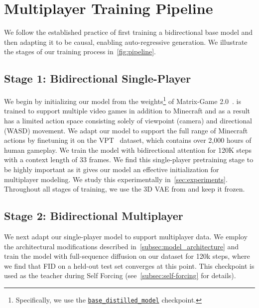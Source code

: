 
\section{Multiplayer Training Pipeline}
\label{sec:model_architecture}
We follow the established practice of first training a bidirectional base model and then adapting it to be causal, enabling auto-regressive generation. We illustrate the stages of our training process in~\cref{fig:pipeline}.


\subsection{Stage 1: Bidirectional Single-Player}
\label{sec:bidirectional_sp_training}

We begin by initializing our model from the weights\footnote{Specifically, we use the \href{https://huggingface.co/Skywork/Matrix-Game-2.0/tree/main/base_distilled_model}{\texttt{base\_distilled\_model}} checkpoint.} of Matrix-Game 2.0~\cite{he2025matrixgame20opensourcerealtime}. \matrixgame is trained to support multiple video games in addition to Minecraft and as a result has a limited action space consisting solely of viewpoint (camera) and directional (WASD) movement. We adapt our model to support the full range of Minecraft actions by finetuning it on the VPT~\cite{baker2022videopretrainingvptlearning} dataset, which contains over 2,000 hours of human gameplay. We train the model with bidirectional attention for 120K steps with a context length of 33 frames. We find this single-player pretraining stage to be highly important as it gives our model an effective initialization for multiplayer modeling. We study this experimentally in~\cref{sec:experiments}. Throughout all stages of training, we  use the 3D VAE from \matrixgame and keep it frozen.

\subsection{Stage 2: Bidirectional Multiplayer} 

We next adapt our single-player model to support multiplayer data. We employ the architectural modifications described in~\cref{subsec:model_architecture} and train the model with full-sequence diffusion on our dataset for 120k steps, where we find that FID on a held-out test set converges at this point. This checkpoint is used as the teacher during Self Forcing (see~\cref{subsec:self-forcing} for details). 

